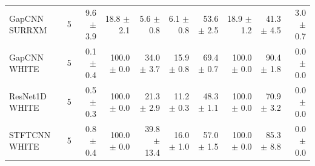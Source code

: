 \begin{table}[t]
\begin{tabular}{lrrrrrrrrr}
GapCNN SURRXM & 5 & 9.6 $\pm$ 3.9 & 18.8 $\pm$ 2.1 & 5.6 $\pm$ 0.8 & 6.1 $\pm$ 0.8 & 53.6 $\pm$ 2.5 & 18.9 $\pm$ 1.2 & 41.3 $\pm$ 4.5 & 3.0 $\pm$ 0.7 \\
GapCNN WHITE & 5 & 0.1 $\pm$ 0.4 & 100.0 $\pm$ 0.0 & 34.0 $\pm$ 3.7 & 15.9 $\pm$ 0.8 & 69.4 $\pm$ 0.7 & 100.0 $\pm$ 0.0 & 90.4 $\pm$ 1.8 & 0.0 $\pm$ 0.0 \\
ResNet1D WHITE & 5 & 0.5 $\pm$ 0.3 & 100.0 $\pm$ 0.0 & 21.3 $\pm$ 2.9 & 11.2 $\pm$ 0.3 & 48.3 $\pm$ 1.1 & 100.0 $\pm$ 0.0 & 70.9 $\pm$ 3.2 & 0.0 $\pm$ 0.0 \\
STFTCNN WHITE & 5 & 0.8 $\pm$ 0.4 & 100.0 $\pm$ 0.0 & 39.8 $\pm$ 13.4 & 16.0 $\pm$ 1.0 & 57.0 $\pm$ 1.5 & 100.0 $\pm$ 0.0 & 85.3 $\pm$ 8.8 & 0.0 $\pm$ 0.0 \\
\bottomrule
\end{tabular}
\end{table}
